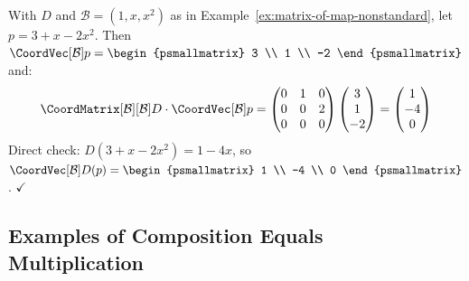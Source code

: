 \begin{example}[{$\CoordVec[\mathcal{B}]{D(p)} = \CoordMatrix[\mathcal{B}][\mathcal{B}]{D} \cdot \CoordVec[\mathcal{B}]{p}$} --- II]
    With $D$ and $\mathcal{B} = (1, x, x^2)$ as in
    Example~\ref{ex:matrix-of-map-nonstandard}, let $p = 3 + x - 2x^2$. Then
    $\CoordVec[\mathcal{B}]{p}
    = \begin{psmallmatrix} 3 \\ 1 \\ -2 \end{psmallmatrix}$ and:
    \[
        \CoordMatrix[\mathcal{B}][\mathcal{B}]{D} \cdot \CoordVec[\mathcal{B}]{p}
        = \begin{pmatrix} 0 & 1 & 0 \\ 0 & 0 & 2 \\ 0 & 0 & 0 \end{pmatrix}
          \begin{pmatrix} 3 \\ 1 \\ -2 \end{pmatrix}
        = \begin{pmatrix} 1 \\ -4 \\ 0 \end{pmatrix}
    \]
    Direct check: $D(3 + x - 2x^2) = 1 - 4x$, so
    $\CoordVec[\mathcal{B}]{D(p)}
    = \begin{psmallmatrix} 1 \\ -4 \\ 0 \end{psmallmatrix}$. $\checkmark$
\end{example}

\subsection{Examples of Composition Equals Multiplication}

